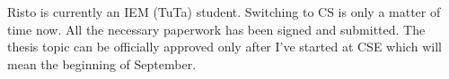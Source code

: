 Risto is currently an IEM (TuTa) student. Switching to CS is only a matter of time now. All the necessary paperwork has been signed and submitted. The thesis topic can be officially approved only after I've started at CSE which will mean the beginning of September.